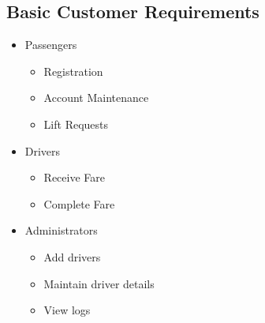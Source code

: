 \documentclass[10pt,twocolumn]{witseiepaper}
\begin{document}
\subsection{Basic Customer Requirements}
\begin{itemize}
\item Passengers
\begin{itemize}
\item Registration
\item Account Maintenance
\item Lift Requests
\end{itemize}
\item Drivers
\begin{itemize}
\item Receive Fare
\item Complete Fare
\end{itemize}
\item Administrators
\begin{itemize}
\item Add drivers
\item Maintain driver details
\item View logs
\end{itemize}
\end{itemize}
\end{document}
